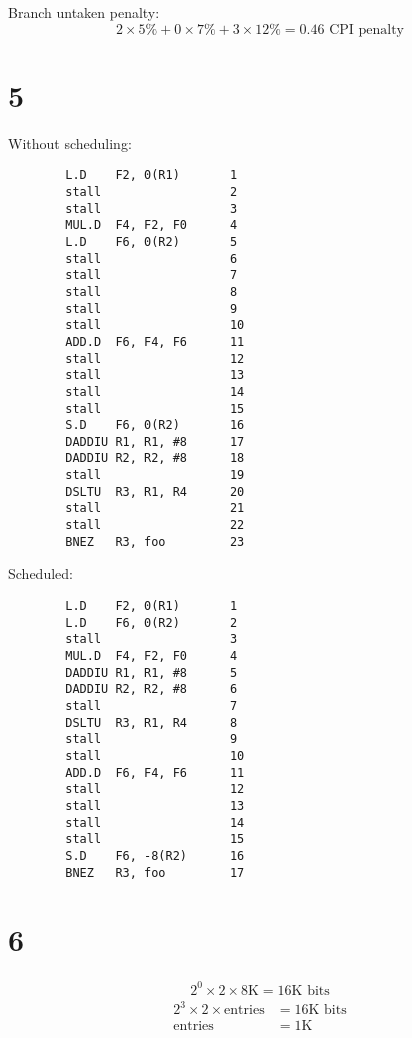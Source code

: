 \documentclass{article}
\begin{document}
\begin{multicols*}{2}
    Branch untaken penalty:
    \[
        2\times 5\% + 0 \times 7\% + 3\times 12\% = 0.46 \text{ CPI penalty}
    \]

    \section*{5}
    Without scheduling:
    \begin{verbatim}
        L.D    F2, 0(R1)       1
        stall                  2
        stall                  3
        MUL.D  F4, F2, F0      4
        L.D    F6, 0(R2)       5
        stall                  6
        stall                  7
        stall                  8
        stall                  9
        stall                  10
        ADD.D  F6, F4, F6      11
        stall                  12
        stall                  13
        stall                  14
        stall                  15
        S.D    F6, 0(R2)       16
        DADDIU R1, R1, #8      17
        DADDIU R2, R2, #8      18
        stall                  19
        DSLTU  R3, R1, R4      20
        stall                  21
        stall                  22
        BNEZ   R3, foo         23
    \end{verbatim}
    Scheduled:
    \begin{verbatim}
        L.D    F2, 0(R1)       1
        L.D    F6, 0(R2)       2
        stall                  3
        MUL.D  F4, F2, F0      4
        DADDIU R1, R1, #8      5
        DADDIU R2, R2, #8      6
        stall                  7
        DSLTU  R3, R1, R4      8
        stall                  9
        stall                  10
        ADD.D  F6, F4, F6      11
        stall                  12
        stall                  13
        stall                  14
        stall                  15
        S.D    F6, -8(R2)      16
        BNEZ   R3, foo         17
    \end{verbatim}
    \section*{6}
    \begin{align*}
        2^0 \times 2 \times 8\text{K} = 16 \text{K bits}
    \end{align*}
    \begin{align*}
        2^3 \times 2 \times \text{entries} & = 16 \text{K bits} \\
        \text{entries}                     & = 1\text{K}
    \end{align*}
\end{multicols*}
\end{document}
